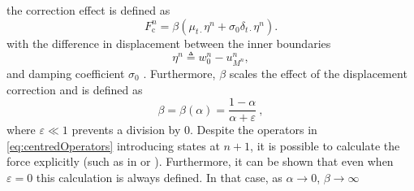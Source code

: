 the correction effect %
is defined as %
\begin{equation}\label{eq:dispCorrForce}
    F_\text{c}^n = \beta \left(\mu_{t\cdot}\eta^n +\sigma_0\delta_{t\cdot}\eta^n \right).
\end{equation}
with the difference in displacement between the inner boundaries
\begin{equation}\label{eq:etaDispCorr}
    \eta^n \triangleq w_0^n - u_{M^n}^n,
\end{equation}
and damping coefficient $\sigma_0$%
. Furthermore, $\beta$ scales the effect of the displacement correction and is defined as
\begin{equation}\label{eq:betaDef}
    \beta = \beta(\alpha) = \frac{1-\alpha}{\alpha + \varepsilon}\ ,
\end{equation}
where $\varepsilon \ll 1$ prevents a division by 0. Despite the operators in \eqref{eq:centredOperators} introducing states at $n+1$, it is possible to calculate the force explicitly (such as in \cite{bilbao2009} or \cite{bilbao2009Dafx}). Furthermore, it can be shown that even when $\varepsilon = 0$ this calculation is always defined. In that case, as $\alpha \rightarrow 0$, $\beta\rightarrow \infty$ 
